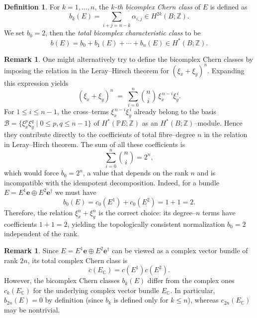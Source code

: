 \documentclass[11pt]{amsart}
\newcommand{\C}{\mathbb{C}}          %
\newcommand{\Z}{\mathbb{Z}}
\newcommand{\e}{\mathbf{e}}          %
\newcommand{\ed}{\mathbf{e}^\dagger} %
\newcommand{\wb}{b}
\theoremstyle{definition}
\newtheorem{defn}[prop]{Definition}       %
\newtheorem{remark}[prop]{Remark}            %
\begin{document}
\begin{defn}\label{def:bicomplex-chiern-classes}
    For $k = 1, \dots, n$, the \emph{$k$-th bicomplex Chern class} of $E$ is defined as
    \begin{equation*}
        \wb_k(E) = \sum_{i+j = n-k} \alpha_{i,j} \in H^{2k}(B;\Z).
    \end{equation*}
    We set $b_0=2$, then the \emph{total bicomplex characteristic class} to be
    \begin{equation*}
        \wb(E) = b_0 + \wb_1(E) + \cdots + \wb_n(E) \in H^*(B;\Z).
    \end{equation*}
\end{defn}

\begin{remark}
One might alternatively try to define the bicomplex Chern classes by imposing the relation in the Leray--Hirsch theorem for $(\xi_x+\xi_y)^n$. Expanding this expression yields
\begin{equation*}
(\xi_x+\xi_y)^n \;=\; \sum_{i=0}^{n}\binom{n}{i}\,\xi_x^{\,n-i}\xi_y^{\,i}.
\end{equation*}
For $1\le i\le n-1$, the cross--terms $\xi_x^{\,n-i}\xi_y^{\,i}$ already belong to the basis 
$\mathcal{B}=\{\xi_x^{p}\xi_y^{q}\mid 0\le p,q\le n-1\}$ 
of $H^{*}(\mathbb{P}E;\Z)$ as an $H^{*}(B;\Z)$--module. Hence they contribute directly to the coefficients of total fibre--degree $n$ in the relation in Leray--Hirch theorem. The sum of all these coefficients is
\begin{equation*}
\sum_{i=0}^{n}\binom{n}{i}=2^{n},
\end{equation*}
which would force $b_0=2^{n}$, a value that depends on the rank $n$ and is incompatible with the idempotent decomposition. Indeed, for a bundle $E=E^{1}\mathbf{e}\oplus E^{2}\ed$ we must have
\begin{equation*}
b_0(E)=c_0(E^{1})+c_0(E^{2})=1+1=2.
\end{equation*}
Therefore, the relation $\xi_x^{n}+\xi_y^{n}$ is the correct choice: its degree--$n$ terms have coefficients $1+1=2$, yielding the topologically consistent normalization $b_0=2$ independent of the rank.
\end{remark}


\begin{remark}
Since $E = E^1\e\oplus E^2\ed$ can be viewed as a complex vector bundle of rank $2n$, its total complex Chern class is
\begin{equation*}
c(E_{\C}) = c(E^1)c(E^2).
\end{equation*}
However, the bicomplex Chern classes $b_k(E)$ differ from the complex ones $c_k(E_{\C})$ for the underlying complex vector bundle $E_\C$. In particular, $\wb_{2n}(E) = 0$ by definition (since $\wb_k$ is defined only for $k \le n$), whereas $c_{2n}(E_{\C})$ may be nontrivial.
\end{remark}
\end{document}
